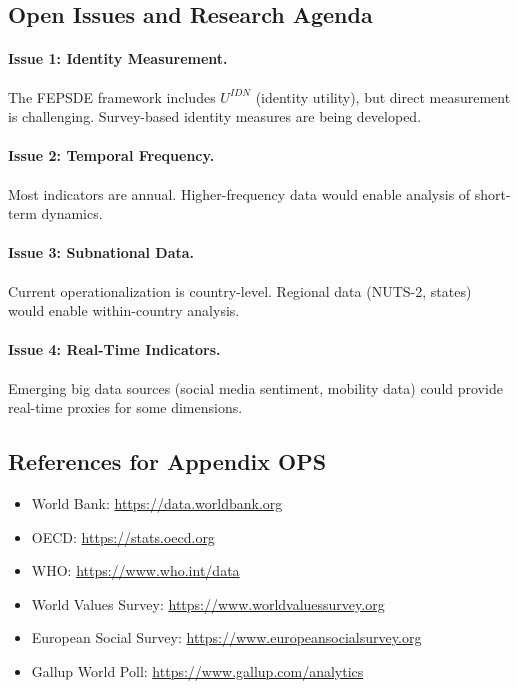 \subsection{Open Issues and Research Agenda}
\label{sec:E-openissues}

\paragraph{Issue 1: Identity Measurement.}
The FEPSDE framework includes $U^{IDN}$ (identity utility), but direct
measurement is challenging. Survey-based identity measures are being developed.

\paragraph{Issue 2: Temporal Frequency.}
Most indicators are annual. Higher-frequency data would enable
analysis of short-term dynamics.

\paragraph{Issue 3: Subnational Data.}
Current operationalization is country-level. Regional data (NUTS-2, states)
would enable within-country analysis.

\paragraph{Issue 4: Real-Time Indicators.}
Emerging big data sources (social media sentiment, mobility data) could
provide real-time proxies for some dimensions.


\subsection{References for Appendix OPS}
\label{sec:E-references}

\begin{itemize}[nosep]
    \item World Bank: \url{https://data.worldbank.org}
    \item OECD: \url{https://stats.oecd.org}
    \item WHO: \url{https://www.who.int/data}
    \item World Values Survey: \url{https://www.worldvaluessurvey.org}
    \item European Social Survey: \url{https://www.europeansocialsurvey.org}
    \item Gallup World Poll: \url{https://www.gallup.com/analytics}
\end{itemize}

